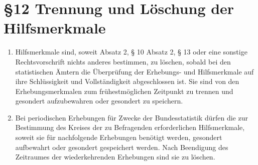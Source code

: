     \section{\S 12 Trennung und Löschung der Hilfsmerkmale}
        \begin{enumerate}[label=(\arabic*)]
            \item Hilfsmerkmale sind, soweit Absatz 2, § 10 Absatz 2, § 13 oder eine sonstige Rechtsvorschrift nichts anderes bestimmen, zu löschen, sobald bei den statistischen Ämtern die Überprüfung der Erhebungs- und Hilfsmerkmale auf ihre Schlüssigkeit und Vollständigkeit abgeschlossen ist. Sie sind von den Erhebungsmerkmalen zum frühestmöglichen Zeitpunkt zu trennen und gesondert aufzubewahren oder gesondert zu speichern.
            \item Bei periodischen Erhebungen für Zwecke der Bundesstatistik dürfen die zur Bestimmung des Kreises der zu Befragenden erforderlichen Hilfsmerkmale, soweit sie für nachfolgende Erhebungen benötigt werden, gesondert aufbewahrt oder gesondert gespeichert werden. Nach Beendigung des Zeitraumes der wiederkehrenden Erhebungen sind sie zu löschen.
        \end{enumerate}
